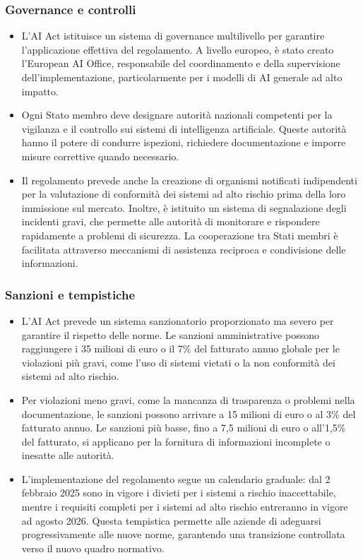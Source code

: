 \documentclass{beamer}
\begin{document}
\begin{frame}
\frametitle{Governance e controlli}
\begin{itemize}
\small
\item L'AI Act istituisce un sistema di governance multilivello per garantire l'applicazione effettiva del regolamento. A livello europeo, è stato creato l'European AI Office, responsabile del coordinamento e della supervisione dell'implementazione, particolarmente per i modelli di AI generale ad alto impatto.

\item Ogni Stato membro deve designare autorità nazionali competenti per la vigilanza e il controllo sui sistemi di intelligenza artificiale. Queste autorità hanno il potere di condurre ispezioni, richiedere documentazione e imporre misure correttive quando necessario.

\item Il regolamento prevede anche la creazione di organismi notificati indipendenti per la valutazione di conformità dei sistemi ad alto rischio prima della loro immissione sul mercato. Inoltre, è istituito un sistema di segnalazione degli incidenti gravi, che permette alle autorità di monitorare e rispondere rapidamente a problemi di sicurezza. La cooperazione tra Stati membri è facilitata attraverso meccanismi di assistenza reciproca e condivisione delle informazioni.
\end{itemize}
\end{frame}
%
%
\begin{frame}
\frametitle{Sanzioni e tempistiche}
\begin{itemize}
\small
\item L'AI Act prevede un sistema sanzionatorio proporzionato ma severo per garantire il rispetto delle norme. Le sanzioni amministrative possono raggiungere i 35 milioni di euro o il 7\% del fatturato annuo globale per le violazioni più gravi, come l'uso di sistemi vietati o la non conformità dei sistemi ad alto rischio.

\item Per violazioni meno gravi, come la mancanza di trasparenza o problemi nella documentazione, le sanzioni possono arrivare a 15 milioni di euro o al 3\% del fatturato annuo. Le sanzioni più basse, fino a 7,5 milioni di euro o all'1,5\% del fatturato, si applicano per la fornitura di informazioni incomplete o inesatte alle autorità.

\item L'implementazione del regolamento segue un calendario graduale: dal 2 febbraio 2025 sono in vigore i divieti per i sistemi a rischio inaccettabile, mentre i requisiti completi per i sistemi ad alto rischio entreranno in vigore ad agosto 2026. Questa tempistica permette alle aziende di adeguarsi progressivamente alle nuove norme, garantendo una transizione controllata verso il nuovo quadro normativo.
\end{itemize}
\end{frame}
\end{document}
